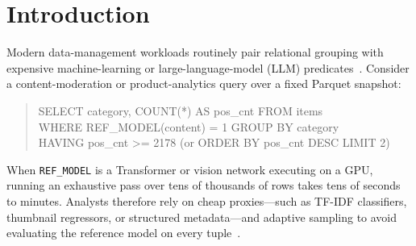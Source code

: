 \section{Introduction}
\label{sec:intro}

Modern data-management workloads routinely pair relational grouping with expensive machine-learning or large-language-model (LLM) predicates~\cite{kang2019blazeit,patel2025lotus,liu2025palimpzest,shankar2025docetl}.
Consider a content-moderation or product-analytics query over a fixed Parquet snapshot:
\begin{quote}\small\ttfamily
SELECT category, COUNT(*) AS pos\_cnt FROM items\\
WHERE REF\_MODEL(content) = 1 GROUP BY category\\
HAVING pos\_cnt >= 2178 \quad\textnormal{(or ORDER BY pos\_cnt DESC LIMIT 2)}
\end{quote}
When \texttt{REF\_MODEL} is a Transformer or vision network executing on a GPU, running an exhaustive pass over tens of thousands of rows takes tens of seconds to minutes.
Analysts therefore rely on cheap proxies---such as TF-IDF classifiers, thumbnail regressors, or structured metadata---and adaptive sampling to avoid evaluating the reference model on every tuple~\cite{kang2017noscope,kang2020supg,kang2021abae,zeighami2026bargain}.

